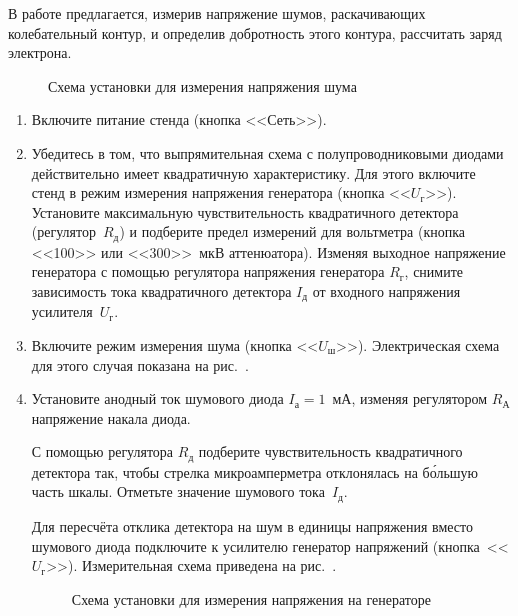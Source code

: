 \begin{lab:task}
В работе предлагается, измерив напряжение шумов, раскачивающих колебательный контур, и определив добротность этого
контура, рассчитать заряд электрона.

\begin{figure}[h!]
	\caption{Схема установки для измерения напряжения шума}
\end{figure}
	\begin{enumerate}

	\item Включите питание стенда (кнопка <<Сеть>>).

	\item Убедитесь в том, что выпрямительная схема с полупроводниковыми диодами действительно имеет квадратичную
характеристику. Для этого включите стенд в режим измерения напряжения генератора (кнопка <<$U_{\text{г}}$>>). Установите
максимальную  чувствительность квадратичного детектора (регулятор~$R_{\text{д}}$) и подберите предел измерений для вольтметра
(кнопка <<100>> или <<300>>~мкВ аттенюатора). Изменяя выходное напряжение генератора с помощью регулятора напряжения
генератора $R_{\text{г}}$, снимите зависимость тока квадратичного детектора $I_{\text{д}}$ от входного напряжения усилителя~$U_{\text{г}}$.

 
	\item Включите режим измерения шума (кнопка <<$U_{\text{ш}}$>>). Электрическая схема для этого случая показана на рис.~.

	\item Установите анодный ток шумового диода $I_{\text{а}}=1$~мА, изменяя регулятором $R_{\text{А}}$ напряжение накала диода.

С помощью регулятора $R_{\text{д}}$ подберите чувствительность квадратичного детектора так, чтобы стрелка микроамперметра
отклонялась на б\'ольшую часть шкалы. Отметьте значение шумового тока~$I_{\text{д}}$.

Для пересчёта отклика детектора на шум в единицы напряжения вместо шумового диода подключите к усилителю генератор
напряжений (кнопка~<<$U_{\text{г}}$>>). Измерительная схема приведена на рис.~.

\begin{figure}[h!]
	\caption{Схема установки для измерения напряжения на генераторе}
\end{figure}


\end{enumerate}
\end{lab:task}
